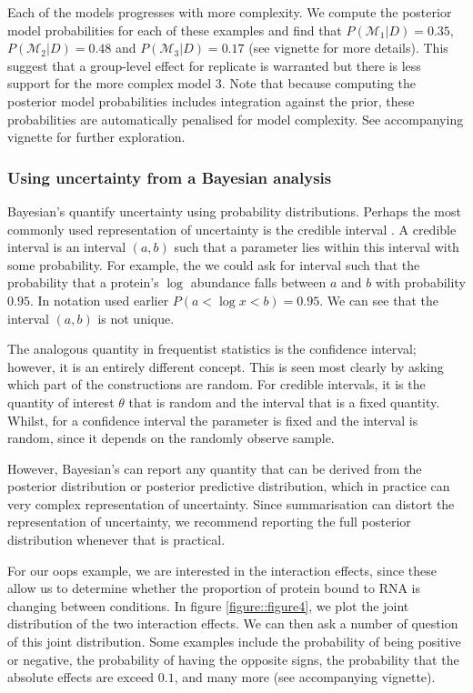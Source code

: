 \documentclass[12pt,english, journal=jpr, layout=twocolumn]{article}
\begin{document}
Each of the models progresses with more complexity. We compute the posterior model probabilities for each of these examples and find that $P(\mathcal{M}_1|D) = 0.35$, $P(\mathcal{M}_2|D) = 0.48$ and $P(\mathcal{M}_3|D) = 0.17$ (see vignette for more details). This suggest that a group-level effect for replicate is warranted but there is less support for the more complex model 3. Note that because computing the posterior model probabilities includes integration against the prior, these probabilities are automatically penalised for model complexity. See accompanying vignette for further exploration. 

\subsubsection{Using uncertainty from a Bayesian analysis}
Bayesian's quantify uncertainty using probability distributions. Perhaps the most commonly used representation of uncertainty is the credible interval \citep{Gelman::1995}. A credible interval is an interval $(a,b)$ such that a parameter lies within this interval with some probability. For example, the we could ask for interval such that the probability that a protein's $\log$ abundance falls between $a$ and $b$ with probability $0.95$. In notation used earlier $P(a < \log x < b) = 0.95$. We can see that the interval $(a,b)$ is not unique. 

The analogous quantity in frequentist statistics is the confidence interval; however, it is an entirely different concept. This is seen most clearly by asking which part of the constructions are random. For credible intervals, it is the quantity of interest $\theta$ that is random and the interval that is a fixed quantity. Whilst, for a confidence interval the parameter is fixed and the interval is random, since it depends on the randomly observe sample. 

However, Bayesian's can report any quantity that can be derived from the posterior distribution or posterior predictive distribution, which in practice can very complex representation of uncertainty. Since summarisation can distort the representation of uncertainty, we recommend reporting the full posterior distribution whenever that is practical.

For our oops example, we are interested in the interaction effects, since these allow us to determine whether the proportion of protein bound to RNA is changing between conditions. In figure \ref{figure::figure4}, we plot the joint distribution of the two interaction effects. We can then ask a number of question of this joint distribution. Some examples include the probability of being positive or negative, the probability of having the opposite signs, the probability that the absolute effects are exceed $0.1$, and many more (see accompanying vignette). 
\end{document}
